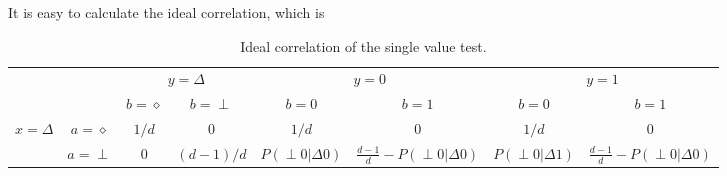 \documentclass[11pt,letterpaper]{article}
\newcommand{\1}{\mathbb{1}}
\newcommand{\tri}{\Delta}
\newcommand{\pr}[2]{P(#1|#2)}
\theoremstyle{definition}
\begin{document}
It is easy to calculate the ideal correlation, which is
\begin{table}[H]
\begin{center}
\begin{tabular}{|c|c||c|c|c|c|c|c|}
\hline
\multicolumn{2}{|c|}{} &
\multicolumn{2}{|c|}{$y=\tri$} &
\multicolumn{2}{|c|}{$y=0$} &
\multicolumn{2}{|c|}{$y=1$}\\
\cline{3-8}
\multicolumn{2}{|c|}{} &$b = \diamond$ & $b = \perp$ & $b = 0$ & $b = 1$ & $b = 0$ & $b = 1$\\
\hline
\hline
\multirow{2}{*}{$x = \tri$} & $a=\diamond$ & $1/d$ & 0 & $1/d$ & 0 & $1/d$ & 0 \\
\cline{2-8}
&$a=\perp$ & 0 & $(d-1)/d$ & \small $\pr{\perp0}{\tri0}$ & \small $\frac{d-1}{d} -\pr{\perp0}{\tri0}$  
& \small $\pr{\perp0}{\tri1}$ & \small $\frac{d-1}{d}- \pr{\perp0}{\tri0}$  \\
\hline
\end{tabular}
\caption{Ideal correlation of the single value test.}
\end{center}
\end{table}
\end{document}
